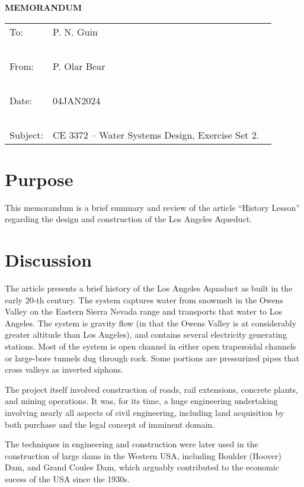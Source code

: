 \documentclass[12pt]{article}
\begin{document}
\begin{center}
\textbf{MEMORANDUM}
\end{center}
\begingroup
\begin{tabular}{p{1in} p{5in}}
To: & P. N. Guin \\ ~\\
From: & P. Olar Bear \\ ~\\
Date: & 04JAN2024 \\ ~\\
Subject: & CE 3372 -- Water Systems Design, Exercise Set 2. ~\\


\end{tabular}
\endgroup
\section*{\small{Purpose}}  
This memorandum is a brief summary and review of the article ``History Lesson'' regarding the design and construction of the Los Angeles Aqueduct.

\section*{\small{Discussion}}
The article presents a brief history of the Los Angeles Aquaduct as built in the early 20-th century.  The system captures water from snowmelt in the Owens Valley on the Eastern Sierra Nevada range and transports that water to Los Angeles.   
The system is gravity flow (in that the Owens Valley is at considerably greater altitude than Los Angeles), and contains several electricity generating stations.  Most of the system is open channel in either open trapezoidal channels or large-bore tunnels dug through rock.  Some portions are pressurized pipes that cross valleys as inverted siphons.

The project itself involved construction of roads, rail extensions, concrete plants, and mining operations.   
It was, for its time, a huge engineering undertaking involving nearly all aspects of civil engineering, including land acquisition by both purchase and the legal concept of imminent domain.  

The techniques in engineering and construction were later used in the construction of large dams in the Western USA, including Boulder (Hoover) Dam, and Grand Coulee Dam, which arguably contributed to the economic sucess of the USA since the 1930s.
\end{document}

